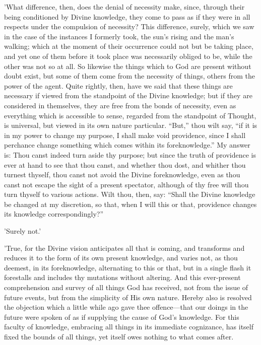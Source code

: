 'What difference, then, does the denial of necessity make, since,
through their being conditioned by Divine knowledge, they come to pass
as if they were in all respects under the compulsion of necessity? This
difference, surely, which we saw in the case of the instances I formerly
took, the sun's rising and the man's walking; which at the moment of
their occurrence could not but be taking place, and yet one of them
before it took place was necessarily obliged to be, while the other was
not so at all. So likewise the things which to God are present without
doubt exist, but some of them come from the necessity of things, others
from the power of the agent. Quite rightly, then, have we said that
these things are necessary if viewed from the standpoint of the Divine
knowledge; but if they are considered in themselves, they are free from
the bonds of necessity, even as everything which is accessible to sense,
regarded from the standpoint of Thought, is universal, but viewed in its
own nature particular. ``But,'' thou wilt say, ``if it is in my power to
change my purpose, I shall make void providence, since I shall perchance
change something which comes within its foreknowledge.'' My answer is:
Thou canst indeed turn aside thy purpose; but since the truth of
providence is ever at hand to see that thou canst, and whether thou
dost, and whither thou turnest thyself, thou canst not avoid the Divine
foreknowledge, even as thou canst not escape the sight of a present
spectator, although of thy free will thou turn thyself to various
actions. Wilt thou, then, say: ``Shall the Divine knowledge be changed at
my discretion, so that, when I will this or that, providence changes its
knowledge correspondingly?''

'Surely not.'

'True, for the Divine vision anticipates all that is coming, and
transforms and reduces it to the form of its own present knowledge, and
varies not, as thou deemest, in its foreknowledge, alternating to this
or that, but in a single flash it forestalls and includes thy mutations
without altering. And this ever-present comprehension and survey of all
things God has received, not from the issue of future events, but from
the simplicity of His own nature. Hereby also is resolved the objection
which a little while ago gave thee offence—that our doings in the
future were spoken of as if supplying the cause of God's knowledge. For
this faculty of knowledge, embracing all things in its immediate
cognizance, has itself fixed the bounds of all things, yet itself owes
nothing to what comes after.

